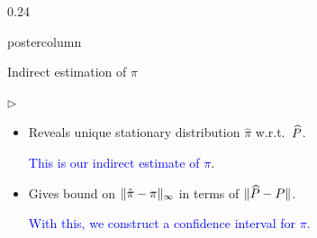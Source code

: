 \documentclass[notheorems,final]{beamer}
\newcommand{\BLUE}[1]{\textcolor{blue}{#1}}
\begin{document}
\begin{frame}{}
\begin{columns}
\begin{column}{0.24\textwidth}
\begin{beamercolorbox}[center,wd=\textwidth]{postercolumn}
\begin{minipage}[T]{.95\textwidth}
{\begin{block}{Indirect estimation of $\pi$}
\begin{list}{$\triangleright$}
\begin{itemize}
                        \smallskip

                      \item
                        Reveals unique stationary distribution $\hat\pi$ w.r.t.~$\widehat P$.

                        \BLUE{This is our indirect estimate of $\pi$}.

                        \smallskip

                      \item
                        Gives
                        bound on $\|\hat\pi-\pi\|_\infty$ in terms of
                        $\|\widehat P - P\|$.

                        \BLUE{With this, we construct a confidence interval
                        for $\pi$.}

                    \end{itemize}

                \end{list}

              \end{block}

}
\end{minipage}
\end{beamercolorbox}
\end{column}
\end{columns}
\end{frame}
\end{document}

